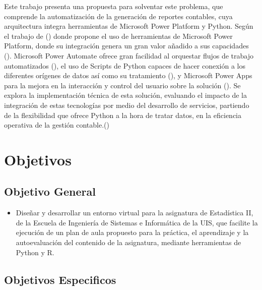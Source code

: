 \documentclass[letter,oneside,12pt,spanish]{report}
\begin{document}

Este trabajo presenta una propuesta para solventar este problema, que comprende la automatización de la generación de reportes contables, cuya arquitectura integra herramientas de Microsoft Power Platform y Python. Según el trabajo de (\cite{narayn2023building}) donde propone el uso de herramientas de Microsoft Power Platform, donde su integración genera un gran valor añadido a sus capacidades (\cite{narayn2023building}). Microsoft Power Automate ofrece gran facilidad al orquestar flujos de trabajo automatizados (\cite{hvartiainen2024leanmanagement}), el uso de Scripts de Python capaces de hacer conexión a los diferentes orígenes de datos así como su tratamiento (\cite{rattenbury2017principles}), y Microsoft Power Apps para la mejora en la interacción y control del usuario sobre la solución (\cite{psimon2022lowcode}). Se explora la implementación técnica de esta solución, evaluando el impacto de la integración de 
estas tecnologías por medio del desarrollo de servicios, partiendo de la flexibilidad que ofrece Python a la hora de tratar datos, en la eficiencia operativa de la gestión contable.(\cite{RCore2020})


\newpage


\chapter{Objetivos}

\section{Objetivo General}

\begin{itemize}
    \item Diseñar y desarrollar un entorno virtual para la asignatura de Estadística II, de la Escuela de Ingeniería de Sistemas e Informática de la UIS, que facilite la ejecución de un plan de aula propuesto para la práctica, el aprendizaje y la autoevaluación del contenido de la asignatura, mediante herramientas de Python y R.
\end{itemize}

\section{Objetivos Especificos}
\end{document}
